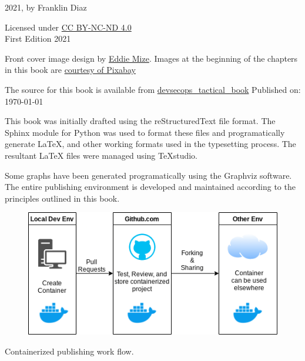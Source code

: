\justify
\textcopyright{} 2021, by Franklin Diaz

\justify
Licensed under \href{https://creativecommons.org/licenses/by-nc-nd/4.0/}{CC BY-NC-ND 4.0} 
\faCreativeCommons\ \faCreativeCommonsBy\ \faCreativeCommonsSa
\vspace{5mm}\\
First Edition 2021

\justify
Front cover image design by {\href{https://www.linkedin.com/in/eddiemize/}{Eddie Mize}}.
Images at the beginning of the chapters in this book are
\href{https://pixabay.com/service/terms/#license}{courtesy of Pixabay}

\justify
The source for this book is available from 
{\href{https://github.com/thedevilsvoice/devsecops\_tactical\_book}{devsecops\_tactical\_book}}
\vspace{3mm}
Published on: \today

\justify
This book was initially drafted using the reStructuredText file format.
The Sphinx module for Python was used to format these files and programatically
generate LaTeX, and other working formats used in the typesetting process. The
resultant LaTeX files were managed using TeXstudio.

Some graphs have been generated programatically using the Graphviz software.
The entire publishing environment is developed and maintained according
to the principles outlined in this book.

\vspace{5mm}
\centering
\vspace{0mm}
\begin{figure}[!htb]
	\centering
	\includegraphics[scale=0.75]{../images/workflow.png}
\end{figure}
\vspace{2mm}
Containerized publishing work flow.
